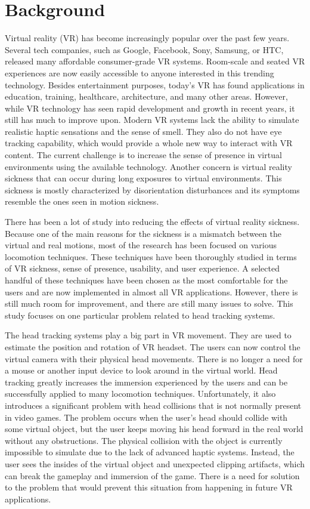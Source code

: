 \section{Background}

Virtual reality (VR) has become increasingly popular over the past few years. Several tech companies, such as Google, Facebook, Sony, Samsung, or HTC, released many affordable consumer-grade VR systems. Room-scale and seated VR experiences are now easily accessible to anyone interested in this trending technology. Besides entertainment purposes, today's VR has found applications in education, training, healthcare, architecture, and many other areas. However, while VR technology has seen rapid development and growth in recent years, it still has much to improve upon. Modern VR systems lack the ability to simulate realistic haptic sensations and the sense of smell. They also do not have eye tracking capability, which would provide a whole new way to interact with VR content. The current challenge is to increase the sense of presence in virtual environments using the available technology. Another concern is virtual reality sickness that can occur during long exposures to virtual environments. This sickness is mostly characterized by disorientation disturbances and its symptoms resemble the ones seen in motion sickness.

There has been a lot of study into reducing the effects of virtual reality sickness. Because one of the main reasons for the sickness is a mismatch between the virtual and real motions, most of the research has been focused on various locomotion techniques. These techniques have been thoroughly studied in terms of VR sickness, sense of presence, usability, and user experience. A selected handful of these techniques have been chosen as the most comfortable for the users and are now implemented in almost all VR applications. However, there is still much room for improvement, and there are still many issues to solve. This study focuses on one particular problem related to head tracking systems.

The head tracking systems play a big part in VR movement. They are used to estimate the position and rotation of VR headset. The users can now control the virtual camera with their physical head movements. There is no longer a need for a mouse or another input device to look around in the virtual world. Head tracking greatly increases the immersion experienced by the users and can be successfully applied to many locomotion techniques. Unfortunately, it also introduces a significant problem with head collisions that is not normally present in video games. The problem occurs when the user's head should collide with some virtual object, but the user keeps moving his head forward in the real world without any obstructions. The physical collision with the object is currently impossible to simulate due to the lack of advanced haptic systems. Instead, the user sees the insides of the virtual object and unexpected clipping artifacts, which can break the gameplay and immersion of the game. There is a need for solution to the problem that would prevent this situation from happening in future VR applications.

